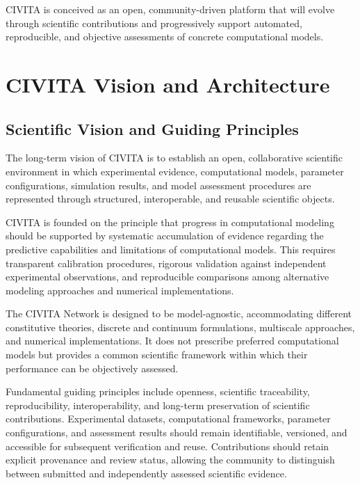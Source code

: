 CIVITA is conceived as an open, community-driven platform that will evolve through scientific contributions and progressively support automated, reproducible, and objective assessments of concrete computational models.








\normalsize
\chapter{CIVITA Vision and Architecture}


\section{Scientific Vision and Guiding Principles}

The long-term vision of CIVITA is to establish an open, collaborative scientific environment in which experimental evidence, computational models, parameter configurations, simulation results, and model assessment procedures are represented through structured, interoperable, and reusable scientific objects.

CIVITA is founded on the principle that progress in computational modeling should be supported by systematic accumulation of evidence regarding the predictive capabilities and limitations of computational models. This requires transparent calibration procedures, rigorous validation against independent experimental observations, and reproducible comparisons among alternative modeling approaches and numerical implementations.

The CIVITA Network is designed to be model-agnostic, accommodating different constitutive theories, discrete and continuum formulations, multiscale approaches, and numerical implementations. It does not prescribe preferred computational models but provides a common scientific framework within which their performance can be objectively assessed.

Fundamental guiding principles include openness, scientific traceability, reproducibility, interoperability, and long-term preservation of scientific contributions. Experimental datasets, computational frameworks, parameter configurations, and assessment results should remain identifiable, versioned, and accessible for subsequent verification and reuse. Contributions should retain explicit provenance and review status, allowing the community to distinguish between submitted and independently assessed scientific evidence.

